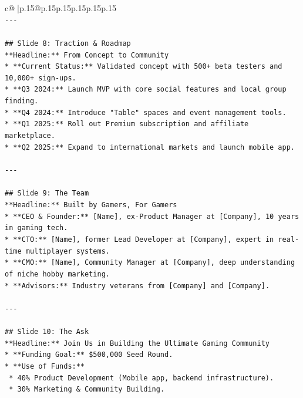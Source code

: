 \documentclass{article}
\begin{document}
{\begin{supertabular}{c@{$\;$}|p{.15\linewidth}@{}p{.15\linewidth}p{.15\linewidth}p{.15\linewidth}p{.15\linewidth}p{.15\linewidth}}
{{{\\ 
\texttt{{-}{-}{-}} \\
\\ 
\texttt{\#\# Slide 8: Traction \& Roadmap} \\
\texttt{**Headline:** From Concept to Community} \\
\texttt{*   **Current Status:** Validated concept with 500+ beta testers and 10,000+ sign{-}ups.} \\
\texttt{*   **Q3 2024:** Launch MVP with core social features and local group finding.} \\
\texttt{*   **Q4 2024:** Introduce "Table" spaces and event management tools.} \\
\texttt{*   **Q1 2025:** Roll out Premium subscription and affiliate marketplace.} \\
\texttt{*   **Q2 2025:** Expand to international markets and launch mobile app.} \\
\\ 
\texttt{{-}{-}{-}} \\
\\ 
\texttt{\#\# Slide 9: The Team} \\
\texttt{**Headline:** Built by Gamers, For Gamers} \\
\texttt{*   **CEO \& Founder:** {[}Name{]}, ex{-}Product Manager at {[}Company{]}, 10 years in gaming tech.} \\
\texttt{*   **CTO:** {[}Name{]}, former Lead Developer at {[}Company{]}, expert in real{-}time multiplayer systems.} \\
\texttt{*   **CMO:** {[}Name{]}, Community Manager at {[}Company{]}, deep understanding of niche hobby marketing.} \\
\texttt{*   **Advisors:** Industry veterans from {[}Company{]} and {[}Company{]}.} \\
\\ 
\texttt{{-}{-}{-}} \\
\\ 
\texttt{\#\# Slide 10: The Ask} \\
\texttt{**Headline:** Join Us in Building the Ultimate Gaming Community} \\
\texttt{*   **Funding Goal:** \$500,000 Seed Round.} \\
\texttt{*   **Use of Funds:**} \\
\texttt{    *   40\% Product Development (Mobile app, backend infrastructure).} \\
\texttt{    *   30\% Marketing \& Community Building.} \\
}}}
\end{supertabular}}
\end{document}
